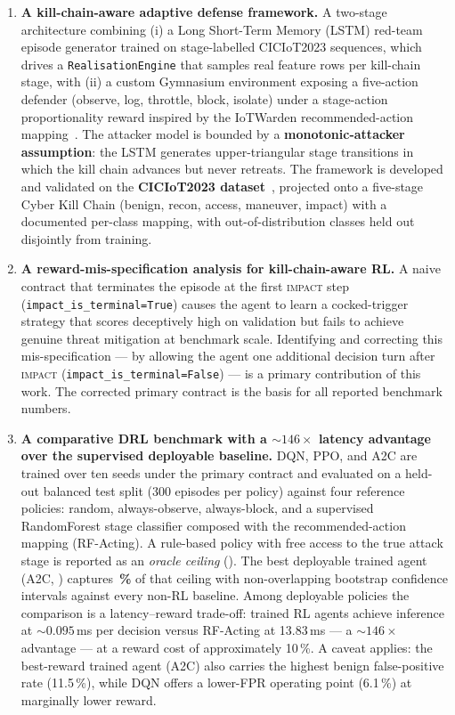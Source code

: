 \begin{enumerate}
    \item \textbf{A kill-chain-aware adaptive defense framework.} A two-stage architecture combining (i) a Long Short-Term Memory (LSTM) red-team episode generator trained on stage-labelled CICIoT2023 sequences, which drives a \texttt{RealisationEngine} that samples real feature rows per kill-chain stage, with (ii) a custom Gymnasium environment exposing a five-action defender (observe, log, throttle, block, isolate) under a stage-action proportionality reward inspired by the IoTWarden recommended-action mapping~\cite{Alam2024}. The attacker model is bounded by a \textbf{monotonic-attacker assumption}: the LSTM generates upper-triangular stage transitions in which the kill chain advances but never retreats. The framework is developed and validated on the \textbf{CICIoT2023 dataset}~\cite{Neto2023}, projected onto a five-stage Cyber Kill Chain (benign, recon, access, maneuver, impact) with a documented per-class mapping, with out-of-distribution classes held out disjointly from training.

    \item \textbf{A reward-mis-specification analysis for kill-chain-aware RL.} A naive contract that terminates the episode at the first \textsc{impact} step ({\small\texttt{impact\_is\_terminal=True}}) causes the agent to learn a cocked-trigger strategy that scores deceptively high on validation but fails to achieve genuine threat mitigation at benchmark scale. Identifying and correcting this mis-specification --- by allowing the agent one additional decision turn after \textsc{impact} ({\small\texttt{impact\_is\_terminal=False}}) --- is a primary contribution of this work. The corrected primary contract is the basis for all reported benchmark numbers.

    \item \textbf{A comparative DRL benchmark with a ${\sim}146{\times}$ latency advantage over the supervised deployable baseline.} DQN, PPO, and A2C are trained over ten seeds under the primary contract and evaluated on a held-out balanced test split (300 episodes per policy) against four reference policies: random, always-observe, always-block, and a supervised RandomForest stage classifier composed with the recommended-action mapping (RF-Acting). A rule-based policy with free access to the true attack stage is reported as an \emph{oracle ceiling} (\OracleCeiling{}). The best deployable trained agent (A2C, \BestAgentReward{}) captures \textbf{\OracleCapturePct{}\,\%} of that ceiling with non-overlapping bootstrap confidence intervals against every non-RL baseline. Among deployable policies the comparison is a latency--reward trade-off: trained RL agents achieve inference at ${\sim}0.095$\,ms per decision versus RF-Acting at 13.83\,ms --- a ${\sim}146{\times}$ advantage --- at a reward cost of approximately 10\,\%. A caveat applies: the best-reward trained agent (A2C) also carries the highest benign false-positive rate (11.5\,\%), while DQN offers a lower-FPR operating point (6.1\,\%) at marginally lower reward.


\end{enumerate}
